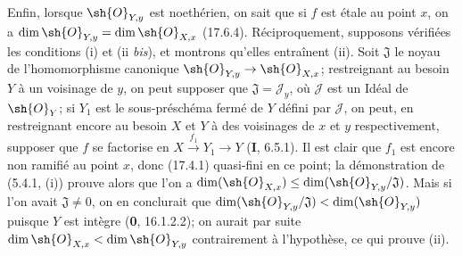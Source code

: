 Enfin, lorsque $\sh{O}_{Y,y}$ est noethérien, on sait que si $f$ est étale au point $x$, on a $\dim\sh{O}_{Y,y}=\dim\sh{O}_{X,x}$ (17.6.4). Réciproquement, supposons vérifiées les conditions (i) et (ii \emph{bis}), et montrons qu'elles entraînent (ii). Soit $\mathfrak J$ le noyau de l'homomorphisme canonique $\sh{O}_{Y,y}\to\sh{O}_{X,x}$; restreignant au besoin $Y$ à un voisinage de $y$, on peut supposer que $\mathfrak J=\mathscr{J}_y$, où $\mathscr{J}$ est un Idéal de $\sh{O}_Y$; si $Y_1$ est le sous-préschéma fermé de $Y$ défini par $\mathscr{J}$, on peut, en restreignant encore au besoin $X$ et $Y$ à des voisinages de $x$ et $y$ respectivement, supposer que $f$ se factorise en $X\xrightarrow{f_1}Y_1\to Y$ (\textbf{I}, 6.5.1). Il est clair que $f_1$ est encore non ramifié au point $x$, donc (17.4.1) quasi-fini en ce point; la démonstration de (5.4.1, (i)) prouve alors que l'on a $\dim(\sh{O}_{X,x})\leq\dim(\sh{O}_{Y,y}/\mathfrak J)$. Mais si l'on avait $\mathfrak J\neq0$, on en conclurait que $\dim(\sh{O}_{Y,y}/\mathfrak J)<\dim(\sh{O}_{Y,y})$ puisque $Y$ est intègre (\textbf{0}, 16.1.2.2); on aurait par suite $\dim\sh{O}_{X,x}<\dim\sh{O}_{Y,y}$ contrairement à l'hypothèse, ce qui prouve (ii).

